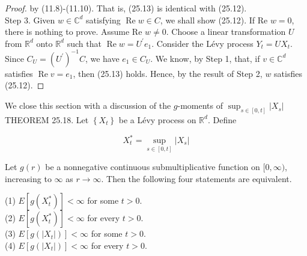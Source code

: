 \documentclass[a4paper,11pt]{article}
\begin{document}
\begin{proof}
    by (11.8)-(11.10). That is, (25.13) is identical with (25.12). \\

    Step 3. Given $w \in \mathbb{C}^{d}$ satisfying $\operatorname{Re} w \in C$, we shall
    show (25.12). If Re $w=0$, there is nothing to prove. Assume Re $w \neq 0$. Choose a
    linear transformation $U$ from $\mathbb{R}^{d}$ onto $\mathbb{R}^{d}$ such that $\operatorname{Re} w=U^{\prime} e_{1}$.
    Consider the Lévy process $Y_{t}=U X_{t}$. Since $C_{U}=\left(U^{\prime}\right)^{-1} C$, we have $e_{1} \in C_{U}$.
    We know, by Step 1, that, if $v \in \mathbb{C}^{d}$ satisfies $\operatorname{Re} v=e_{1}$, then (25.13) holds.
    Hence, by the result of Step 2, $w$ satisfies (25.12).

\end{proof}

We close this section with a discussion of the $g$-moments of $\sup _{s \in[0, t]}\left|X_{s}\right|$ \\

THEOREM 25.18. Let $\left\{X_{t}\right\}$ be a Lévy process on $\mathbb{R}^{d}$. Define

\begin{equation*}
    X_{t}^{*}=\sup _{s \in[0, t]}\left|X_{s}\right| \tag{25.14}
\end{equation*}

Let $g(r)$ be a nonnegative continuous submultiplicative function on $[0, \infty)$, increasing to $\infty$ as $r \rightarrow \infty$.
Then the following four statements are equivalent.

(1) $E\left[g\left(X_{t}^{*}\right)\right]<\infty$ for some $t>0$. \\

(2) $E\left[g\left(X_{t}^{*}\right)\right]<\infty$ for every $t>0$. \\

(3) $E\left[g\left(\left|X_{t}\right|\right)\right]<\infty$ for some $t>0$. \\

(4) $E\left[g\left(\left|X_{t}\right|\right)\right]<\infty$ for every $t>0$. \\
\end{document}
